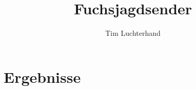 \documentclass[DIN, pagenumber=false, fontsize=11pt, parskip=half]{scrartcl}
\title{Fuchsjagdsender}
\author{Tim Luchterhand}
\begin{document}
\maketitle








\section{Ergebnisse}
\end{document}

